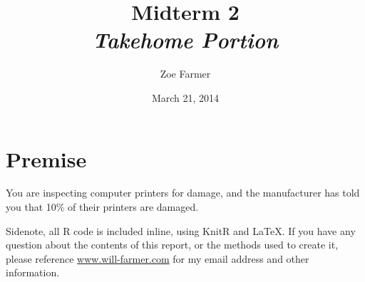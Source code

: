 \documentclass[10pt]{report}\usepackage[]{graphicx}\usepackage[]{xcolor}
\title{Midterm 2\\\textit{Takehome Portion} }
\author{Zoe Farmer}
\date{March 21, 2014}
\begin{document}
\maketitle

\section{Premise}
You are inspecting computer printers for damage, and the manufacturer has told you that 10\% of their printers are
damaged.\newline

Sidenote, all {\ttfamily R} code is included inline, using KnitR and \LaTeX. If you have any question about the contents
of this report, or the methods used to create it, please reference \url{www.will-farmer.com} for my email address and
other information.
\end{document}
